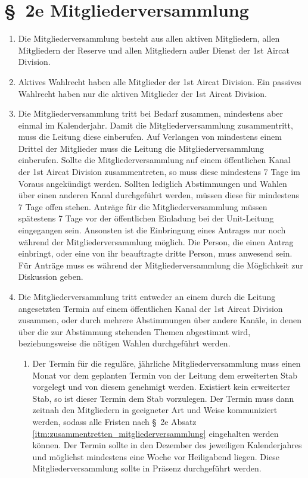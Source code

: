 \section*{\S~2e Mitgliederversammlung}
\label{sec:mitgliederversammlung}

\begin{enumerate}[label=(\arabic*)]
    \item Die Mitgliederversammlung besteht aus allen aktiven Mitgliedern, allen Mitgliedern der Reserve und allen Mitgliedern außer Dienst der 1st Aircat Division.
    \item Aktives Wahlrecht haben alle Mitglieder der 1st Aircat Division. Ein passives Wahlrecht haben nur die aktiven Mitglieder der 1st Aircat Division.
    \item \label{itm:zusammentretten_mitgliederversammlung} Die Mitgliederversammlung tritt bei Bedarf zusammen, mindestens aber einmal im Kalenderjahr. Damit die Mitgliederversammlung zusammentritt, muss die Leitung diese einberufen. Auf Verlangen von mindestens einem Drittel der Mitglieder muss die Leitung die Mitgliederversammlung einberufen. Sollte die Mitgliederversammlung auf einem öffentlichen Kanal der 1st Aircat Division zusammentreten, so muss diese mindestens 7 Tage im Voraus angekündigt werden. Sollten lediglich Abstimmungen und Wahlen über einen anderen Kanal durchgeführt werden, müssen diese für mindestens 7 Tage offen stehen. Anträge für die Mitgliederversammlung müssen spätestens 7 Tage vor der öffentlichen Einladung bei der Unit-Leitung eingegangen sein. Ansonsten ist die Einbringung eines Antrages nur noch während der Mitgliederversammlung möglich. Die Person, die einen Antrag einbringt, oder eine von ihr beauftragte dritte Person, muss anwesend sein. Für Anträge muss es während der Mitgliederversammlung die Möglichkeit zur Diskussion geben.
    \item Die Mitgliederversammlung tritt entweder an einem durch die Leitung angesetzten Termin auf einem öffentlichen Kanal der 1st Aircat Division zusammen, oder durch mehrere Abstimmungen über andere Kanäle, in denen über die zur Abstimmung stehenden Themen abgestimmt wird, beziehungsweise die nötigen Wahlen durchgeführt werden.
    \begin{enumerate}[label=(\Alph*)]
        \item \label{itm:regularer_Termin}Der Termin für die reguläre, jährliche Mitgliederversammlung muss einen Monat vor dem geplanten Termin von der Leitung dem erweiterten Stab vorgelegt und von diesem genehmigt werden. Existiert kein erweiterter Stab, so ist dieser Termin dem Stab vorzulegen. Der Termin muss dann zeitnah den Mitgliedern in geeigneter Art und Weise kommuniziert werden, sodass alle Fristen nach \S~2e Absatz \ref{itm:zusammentretten_mitgliederversammlung} eingehalten werden können. Der Termin sollte in den Dezember des jeweiligen Kalenderjahres und möglichst mindestens eine Woche vor Heiligabend liegen. Diese Mitgliederversammlung sollte in Präsenz durchgeführt werden.

\end{enumerate}
\end{enumerate}
